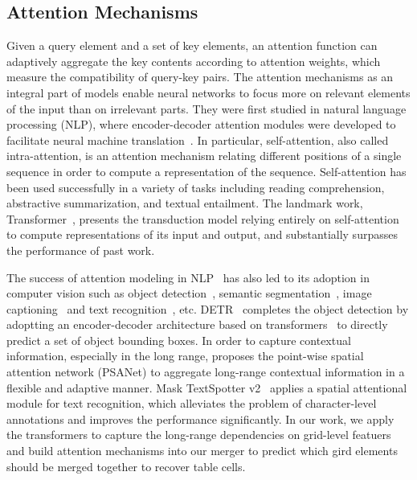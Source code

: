 \documentclass[review]{elsarticle}
\begin{document}
\subsection{Attention Mechanisms}
Given a query element and a set of key elements, an attention function can adaptively aggregate the key contents according to attention weights, which measure the compatibility of query-key pairs. The attention mechanisms as an integral part of models enable neural networks to focus more on relevant elements of the input than on irrelevant parts. They were first studied in natural language processing (NLP), where encoder-decoder attention modules were developed to facilitate neural machine translation~\cite{MachineTranslation-1, MachineTranslation-2, ConvolutionalSequence, Transformer}. In
particular, self-attention, also called intra-attention, is an attention mechanism relating different positions of a single sequence in order to compute a representation of the sequence. Self-attention has been used successfully in a variety of tasks including reading comprehension, abstractive summarization, and textual entailment. The landmark work, Transformer~\cite{Transformer}, presents the transduction model relying entirely on self-attention to compute representations of its input and output, and substantially surpasses the performance of past work. 

The success of attention modeling in NLP~\cite{MachineTranslation-1, ConvolutionalSequence, Transformer} has also led to its adoption in computer vision such as object detection~\cite{DETR, AttentionForDetection}, semantic segmentation~\cite{AttentionForSegmentation-1, AttentionForSegmentation-2}, image captioning~\cite{AttentionForImageCaption} and text recognition~\cite{WAP, MaskTextSpotterV2}, etc. DETR~\cite{DETR} completes the object detection by adoptting an encoder-decoder architecture based on transformers~\cite{Transformer} to directly predict a set of object bounding boxes. In order to capture contextual information, especially in the long range, \cite{AttentionForSegmentation-2} proposes the point-wise spatial attention network (PSANet) to aggregate long-range contextual information in a flexible and adaptive manner. Mask TextSpotter v2~\cite{MaskTextSpotterV2} applies a spatial attentional module for text recognition, which alleviates the problem of character-level annotations and improves the performance significantly. In our work, we apply the transformers to capture the long-range dependencies on grid-level featuers and build attention mechanisms into our merger to predict which gird elements should be merged together to recover table cells.
\end{document}
